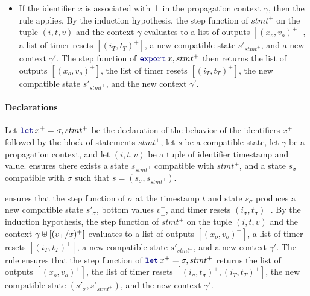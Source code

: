 \begin{skippableproof}
\begin{itemize}
        \item If the identifier $x$ is associated with $\bot$ in the propagation context $\gamma$,
              then the rule  applies.
              By the induction hypothesis, the step function of $stmt^+$ on the tuple $(i, t, v)$
              and the context $\gamma$ evaluates to a list of outputs
              $[(x_o, v_o)^+]$, a list of timer resets $[(i_T, t_T)^+]$, a new compatible state
              $s'_{stmt^+}$, and a new context $\gamma'$.
              The step function of $\export{x}, stmt^+$ then returns the list of outputs
              $[(x_o, v_o)^+]$, the list of timer resets $[(i_T, t_T)^+]$, the new
              compatible state $s'_{stmt^+}$, and the new context $\gamma'$.
    \end{itemize}

    \paragraph{Declarations}
    Let $\decl{x^+}{\sigma}, stmt^+$ be the declaration of the behavior of the identifiers
    $x^+$ followed by the block of statements $stmt^+$, let $s$ be a compatible state, let $\gamma$
    be a propagation context, and let $(i, t, v)$ be a tuple of identifier timestamp and value.
     ensures there exists a state $s_{stmt^+}$
    compatible with $stmt^+$, and a state $s_\sigma$ compatible with $\sigma$ such that $s =
        (s_\sigma, s_{stmt^+})$.

     ensures that the step function of $\sigma$ at the
    timestamp $t$ and state $s_\sigma$ produces a new compatible state $s'_\sigma$, bottom values
    $v_\bot^+$, and timer resets $(i_\sigma, t_\sigma)^+$.
    By the induction hypothesis, the step function of $stmt^+$ on the tuple $(i, t, v)$ and the
    context $\gamma \uplus [(v_\bot/x)^+]$ evaluates to a list of outputs $[(x_o, v_o)^+]$, a list
    of timer resets $[(i_T, t_T)^+]$, a new compatible state $s'_{stmt^+}$, and a new context
    $\gamma'$.
    The rule  ensures that the step function of
    $\decl{x^+}{\sigma}, stmt^+$ returns the list of outputs $[(x_o, v_o)^+]$, the list of
    timer resets $[(i_\sigma, t_\sigma)^+, (i_T, t_T)^+]$, the new compatible state $(s'_\sigma,
        s'_{stmt^+})$, and the new context $\gamma'$.

    \setcounter{paragraph}{0}
\end{skippableproof}

